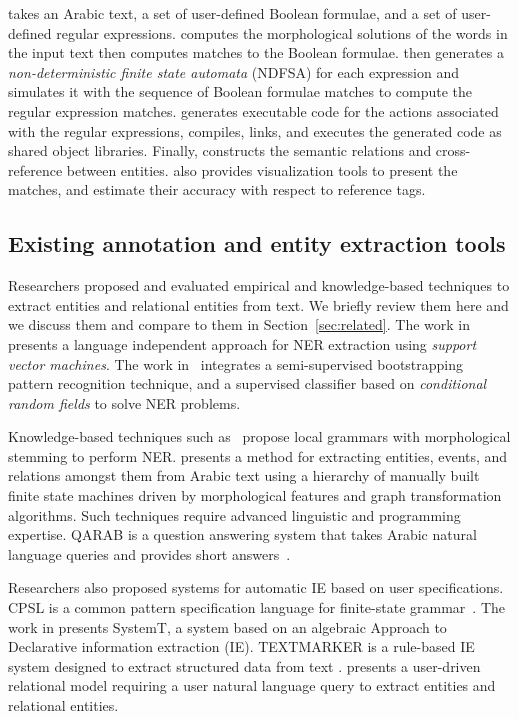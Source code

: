 \framework takes an Arabic text, a set of user-defined \framework Boolean 
formulae, and a set of user-defined \framework regular expressions. 
\framework computes the morphological solutions of the words in the 
input text then computes matches to the Boolean formulae. 
\framework then generates a {\em non-deterministic finite state 
automata} (NDFSA) for each expression and simulates it with the 
sequence of Boolean formulae matches to compute the regular 
expression matches. 
\framework generates executable code for the actions associated with
the regular expressions, 
compiles, links, and executes the generated code 
as shared object libraries. 
Finally, \framework constructs the semantic relations and 
cross-reference between entities. 
\framework also provides visualization tools to present the matches, 
and estimate their accuracy with respect to reference tags.

\subsection{Existing annotation and entity extraction tools}

Researchers proposed and evaluated empirical and 
knowledge-based techniques to extract entities and relational entities
from text. 
We briefly review them here and we discuss them and compare to them
in Section~\ref{sec:related}. 
The work in~\cite{ekbal2010named} presents a language independent 
approach for NER extraction using {\em support vector machines}. 
The work in~\cite{abdelrahman2010integrated} integrates 
a semi-supervised bootstrapping pattern recognition technique, 
and a supervised classifier based on {\em conditional random fields}
to solve NER problems. 

Knowledge-based techniques such 
as~\cite{zaghouani2010adapting,traboulsi2009arabic} propose local grammars 
with morphological stemming to perform NER. 
\cite{ZaMaHaCicling2012Entity} presents a method for extracting entities, 
events, and relations amongst them from Arabic text using a hierarchy of manually built 
finite state machines driven by morphological features and graph 
transformation algorithms. 
Such techniques require advanced linguistic and programming expertise. 
QARAB is a question answering system that takes 
Arabic natural language queries and provides short answers~\cite{hammo2002qarab}. 

Researchers also proposed systems for automatic IE based 
on user specifications. 
CPSL is a common pattern specification language for finite-state 
grammar~\cite{appelt1998common}. 
The work in \cite{chiticariu2010systemt} presents SystemT, a system based on 
an algebraic Approach to Declarative information extraction (IE). 
TEXTMARKER is a rule-based IE system designed to extract structured data from 
text \cite{atzmueller2008rule}. 
\cite{urbain2012user} presents a user-driven relational model 
requiring a user natural language query to extract entities and relational entities.

